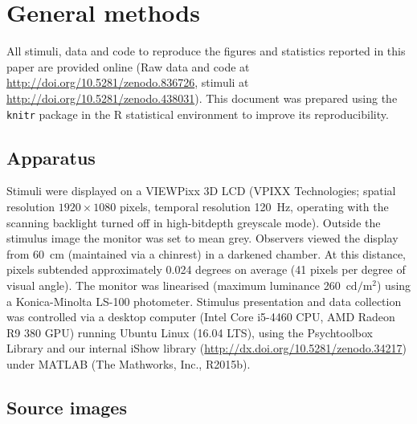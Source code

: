 \documentclass[article, 11pt,a4paper,natbib]{apa6}\usepackage[]{graphicx}\usepackage[]{color}
\begin{document}
\section{General methods}



All stimuli, data and code to reproduce the figures and statistics reported in this paper are provided online (Raw data and code at \url{http://doi.org/10.5281/zenodo.836726}, stimuli at \url{http://doi.org/10.5281/zenodo.438031}).
This document was prepared using the \texttt{knitr} package \citep{xie_knitr_2013, xie_dynamic_2015} in the R statistical environment \citep{r_core_development_team_r:_2016,wickham_dplyr:_2016,wickham_ggplot2_2009,wickham_splitapplycombine_2011, auguie_gridextra:_2016, arnold_ggthemes:_2016} to improve its reproducibility.

\subsection{Apparatus}

Stimuli were displayed on a VIEWPixx 3D LCD (VPIXX Technologies; spatial resolution $1920 \times 1080$ pixels, temporal resolution 120~Hz, operating with the scanning backlight turned off in high-bitdepth greyscale mode).
Outside the stimulus image the monitor was set to mean grey.
Observers viewed the display from 60~cm (maintained via a chinrest) in a darkened chamber.
At this distance, pixels subtended approximately 0.024 degrees on average (41 pixels per degree of visual angle).
The monitor was linearised (maximum luminance 260~$\mathrm{cd}/ \mathrm{m}^2$) using a Konica-Minolta LS-100 photometer.
Stimulus presentation and data collection was controlled via a desktop computer (Intel Core i5-4460 CPU, AMD Radeon R9 380 GPU) running Ubuntu Linux (16.04 LTS), using the Psychtoolbox Library \citep[][version 3.0.12]{pelli_videotoolbox_1997,kleiner_whats_2007,brainard_psychophysics_1997} and our internal iShow library (\url{http://dx.doi.org/10.5281/zenodo.34217}) under MATLAB (The Mathworks, Inc., R2015b).

\subsection{Source images}
\end{document}
